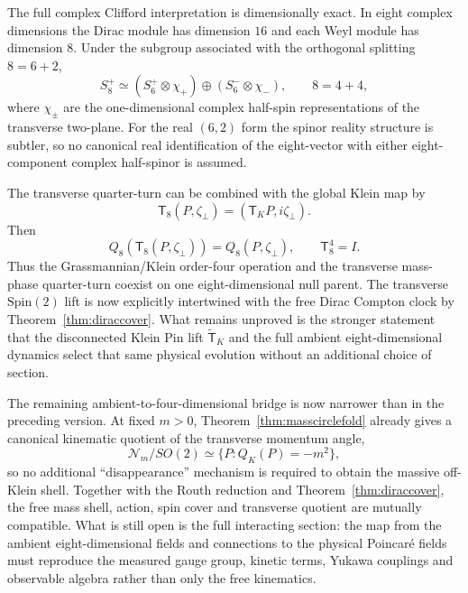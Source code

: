 \documentclass[11pt]{article}
\theoremstyle{definition}\newtheorem{definition}[theorem]{Definition}
\theoremstyle{remark}\newtheorem{remark}[theorem]{Remark}\newtheorem{conjecture}[theorem]{Conjecture}
\begin{document}
The full complex Clifford interpretation is dimensionally exact. In eight complex dimensions the Dirac module has dimension $16$ and each Weyl module has dimension $8$. Under the subgroup associated with the orthogonal splitting $8=6+2$,
\begin{equation}
 S_8^+\simeq(S_6^+\otimes\chi_+)\oplus(S_6^-\otimes\chi_-),
 \qquad \boxed{8=4+4},
\end{equation}
where $\chi_\pm$ are the one-dimensional complex half-spin representations of the transverse two-plane. For the real $(6,2)$ form the spinor reality structure is subtler, so no canonical real identification of the eight-vector with either eight-component complex half-spinor is assumed.

The transverse quarter-turn can be combined with the global Klein map by
\begin{equation}
 \mathsf T_8(P,\zeta_\perp)=(\mathsf T_KP,i\zeta_\perp).
\end{equation}
Then
\begin{equation}
 Q_8(\mathsf T_8(P,\zeta_\perp))=Q_8(P,\zeta_\perp),\qquad
 \boxed{\mathsf T_8^4=I}.
\end{equation}
Thus the Grassmannian/Klein order-four operation and the transverse mass-phase quarter-turn coexist on one eight-dimensional null parent. The transverse $\mathrm{Spin}(2)$ lift is now explicitly intertwined with the free Dirac Compton clock by Theorem~\ref{thm:diraccover}. What remains unproved is the stronger statement that the disconnected Klein Pin lift $\widetilde{\mathsf T}_K$ and the full ambient eight-dimensional dynamics select that same physical evolution without an additional choice of section.

The remaining ambient-to-four-dimensional bridge is now narrower than in the preceding version. At fixed $m>0$, Theorem~\ref{thm:masscirclefold} already gives a canonical kinematic quotient of the transverse momentum angle,
\begin{equation}
 \mathcal N_m/SO(2)\simeq\{P:Q_K(P)=-m^2\},
\end{equation}
so no additional ``disappearance'' mechanism is required to obtain the massive off-Klein shell. Together with the Routh reduction and Theorem~\ref{thm:diraccover}, the free mass shell, action, spin cover and transverse quotient are mutually compatible. What is still open is the full interacting section: the map from the ambient eight-dimensional fields and connections to the physical Poincar\'e fields must reproduce the measured gauge group, kinetic terms, Yukawa couplings and observable algebra rather than only the free kinematics.
\end{document}
